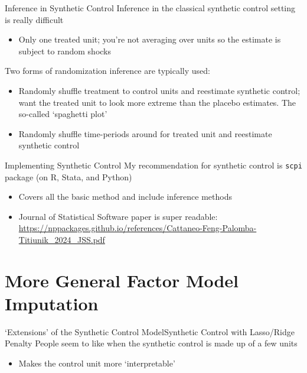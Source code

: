 \documentclass[t]{beamer}
\begin{document}
\begin{frame}{Inference in Synthetic Control}
  Inference in the classical synthetic control setting is really difficult
  \begin{itemize}
    \item Only one treated unit; you're not averaging over units so the estimate is subject to random shocks
  \end{itemize}

  \pause
  \bigskip
  Two forms of randomization inference are typically used:
  \begin{itemize}
    \item Randomly shuffle treatment to control units and reestimate synthetic control; want the treated unit to look more extreme than the placebo estimates. The so-called `spaghetti plot'
    
    \item Randomly shuffle time-periods around for treated unit and reestimate synthetic control
  \end{itemize}
\end{frame}

\begin{frame}{Implementing Synthetic Control}
  My recommendation for synthetic control is \texttt{scpi} package (on R, Stata, and Python)
  \begin{itemize}
    \item Covers all the basic method and include inference methods

    \item Journal of Statistical Software paper is super readable: \url{https://nppackages.github.io/references/Cattaneo-Feng-Palomba-Titiunik_2024_JSS.pdf}
  \end{itemize}

\end{frame}


\section{More General Factor Model Imputation}

\begin{frame}{`Extensions' of the Synthetic Control Model}{Synthetic Control with Lasso/Ridge Penalty}
  People seem to like when the synthetic control is made up of a few units
  \begin{itemize}
    \item Makes the control unit more `interpretable'
  \end{itemize}
\end{frame}
\end{document}
